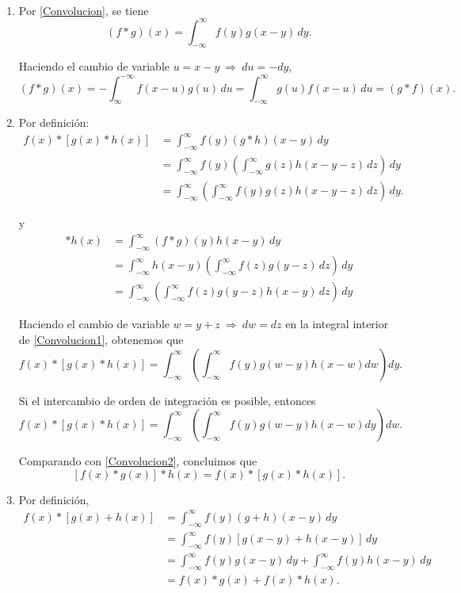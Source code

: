 \begin{demo}
\ 

\begin{enumerate}
    \item Por \eqref{Convolucion}, se tiene
    $$(f*g)(x) =  \int_{-\infty}^{\infty} f(y) g(x-y) \,dy.$$
    
    Haciendo el cambio de variable $u = x-y ~\Rightarrow~ du = -dy$,
    $$ (f*g)(x) = - \int_{\infty}^{-\infty} f(x-u) g(u) \,du =  \int_{-\infty}^{\infty} g(u) f(x-u) \,du = (g*f)(x).$$
    
    \item Por definición:
    \begin{align}
        f(x)*[g(x)*h(x)] &=  \int_{-\infty}^{\infty} f(y) (g*h)(x-y) \,dy \nonumber\\
        &=  \int_{-\infty}^{\infty} f(y) \left( \int_{-\infty}^{\infty} g(z) h(x-y-z) \,dz \right) \,dy  \nonumber\\
        &= \int_{-\infty}^{\infty}  \left(\int_{-\infty}^{\infty}  f(y) g(z) h(x-y-z) \,dz \right) \,dy. \label{Convolucion1}
    \end{align}
    
    y
     \begin{align}
        [f(x)*g(x)]*h(x) &= \int_{-\infty}^{\infty} (f*g)(y) h(x-y) \,dy \nonumber \\
        &=  \int_{-\infty}^{\infty} h(x-y) \left( \int_{-\infty}^{\infty} f(z) g(y-z) \,dz \right) \,dy  \nonumber \\
        &=  \int_{-\infty}^{\infty}  \left(\int_{-\infty}^{\infty}  f(z) g(y-z) h(x-y) \,dz \right) \,dy \label{Convolucion2}
    \end{align}
    
    Haciendo el cambio de variable $w = y+z ~\Rightarrow~ dw = dz$ en la integral interior de \eqref{Convolucion1}, obtenemos que 
    $$ f(x)*[g(x)*h(x)] = \int_{-\infty}^{\infty} \left(\int_{-\infty}^{\infty}  f(y) g(w-y) h(x-w) dw\right) dy.$$
    
    Si el intercambio de orden de integración es posible, entonces 
      $$ f(x)*[g(x)*h(x)] =  \int_{-\infty}^{\infty} \left(\int_{-\infty}^{\infty}  f(y) g(w-y) h(x-w) dy\right) dw.$$
    
    Comparando con \eqref{Convolucion2}, concluimos que 
    $$[f(x)*g(x)]*h(x) = f(x) * [g(x) * h(x)].$$
    
    \item Por definición,
    \begin{align*}
        f(x)*[g(x)+h(x)] &=  \int_{-\infty}^{\infty} f(y) (g+h)(x-y) \,dy \\
        &= \int_{-\infty}^{\infty} f(y) [g(x-y) + h(x-y)] \,dy \\
        &=  \int_{-\infty}^{\infty} f(y)  g(x-y) \,dy +  \int_{-\infty}^{\infty}  f(y)h(x-y) \,dy \\
        &=  f(x)*g(x) + f(x)*h(x).
    \end{align*}
\end{enumerate}
\end{demo}

